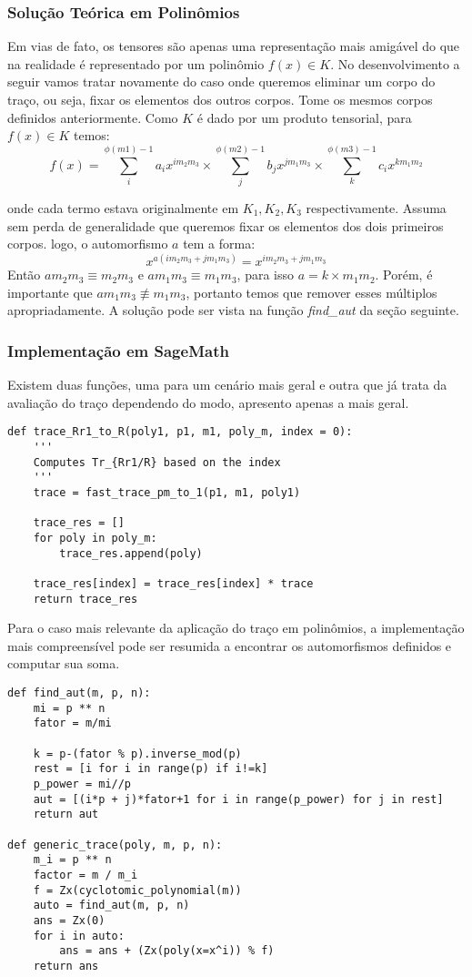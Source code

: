 \subsubsection{Solução Teórica em Polinômios}
Em vias de fato, os tensores são apenas uma representação mais amigável do que 
na realidade é representado por um polinômio $f(x) \in K$. No desenvolvimento a seguir vamos tratar novamente do caso onde queremos eliminar um corpo do traço, ou seja,
fixar os elementos dos outros corpos.
Tome os mesmos corpos definidos anteriormente. Como $K$ é dado por um produto tensorial, para $f(x) \in K$ temos:  
$$
f(x) = \sum_i^{\phi(m1)-1} a_i x^{im_2m_3} \times \sum_j^{\phi(m2)-1} b_j x^{jm_1m_3} \times \sum_k^{\phi(m3)-1} c_i x^{km_1m_2}
$$ 

onde cada termo estava originalmente em $K_1,K_2, K_3$ respectivamente. Assuma sem perda de generalidade que queremos fixar os elementos dos dois primeiros corpos.
logo, o automorfismo $a$ tem a forma: 
$$
 x^{a(im_2m_3 + jm_1m_3)} = x^{im_2m_3 + jm_1m_3}
$$
Então $a m_2 m_3 \equiv m_2 m_3 $ e $a m_1 m_3 \equiv m_1 m_3$, para isso $a = k \times m_1 m_2$. Porém, é importante que $a m_1 m_3 \not\equiv m_1 m_3$, portanto
temos que remover esses múltiplos apropriadamente. A solução pode ser vista na função \textit{find\_aut} da seção seguinte.

\subsubsection{Implementação em SageMath}

Existem duas funções, uma para um cenário mais geral e outra que já trata da avaliação do traço dependendo do modo, apresento apenas a mais geral.

\begin{verbatim}
def trace_Rr1_to_R(poly1, p1, m1, poly_m, index = 0):
    '''
    Computes Tr_{Rr1/R} based on the index
    '''
    trace = fast_trace_pm_to_1(p1, m1, poly1)

    trace_res = []
    for poly in poly_m:
        trace_res.append(poly)

    trace_res[index] = trace_res[index] * trace 
    return trace_res
\end{verbatim}

Para o caso mais relevante da aplicação do traço em polinômios, a implementação mais compreensível pode ser resumida a encontrar os automorfismos definidos 
e computar sua soma. \newpage
\begin{verbatim}
def find_aut(m, p, n):
    mi = p ** n
    fator = m/mi
    
    k = p-(fator % p).inverse_mod(p)
    rest = [i for i in range(p) if i!=k]
    p_power = mi//p
    aut = [(i*p + j)*fator+1 for i in range(p_power) for j in rest]
    return aut

def generic_trace(poly, m, p, n):
    m_i = p ** n 
    factor = m / m_i
    f = Zx(cyclotomic_polynomial(m))
    auto = find_aut(m, p, n) 
    ans = Zx(0)
    for i in auto:
        ans = ans + (Zx(poly(x=x^i)) % f)
    return ans
\end{verbatim}

